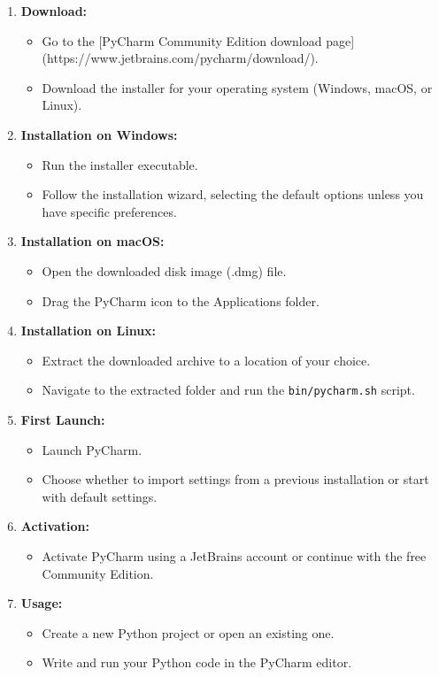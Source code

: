 \begin{enumerate}
	\item \textbf{Download:}
	\begin{itemize}
		\item Go to the [PyCharm Community Edition download page](https://www.jetbrains.com/pycharm/download/).
		\item Download the installer for your operating system (Windows, macOS, or Linux).
	\end{itemize}
	
	\item \textbf{Installation on Windows:}
	\begin{itemize}
		\item Run the installer executable.
		\item Follow the installation wizard, selecting the default options unless you have specific preferences.
	\end{itemize}
	
	\item \textbf{Installation on macOS:}
	\begin{itemize}
		\item Open the downloaded disk image (.dmg) file.
		\item Drag the PyCharm icon to the Applications folder.
	\end{itemize}
	
	\item \textbf{Installation on Linux:}
	\begin{itemize}
		\item Extract the downloaded archive to a location of your choice.
		\item Navigate to the extracted folder and run the \texttt{bin/pycharm.sh} script.
	\end{itemize}
	
	\item \textbf{First Launch:}
	\begin{itemize}
		\item Launch PyCharm.
		\item Choose whether to import settings from a previous installation or start with default settings.
	\end{itemize}
	
	\item \textbf{Activation:}
	\begin{itemize}
		\item Activate PyCharm using a JetBrains account or continue with the free Community Edition.
	\end{itemize}
	
	\item \textbf{Usage:}
	\begin{itemize}
		\item Create a new Python project or open an existing one.
		\item Write and run your Python code in the PyCharm editor.
	\end{itemize}
\end{enumerate}


